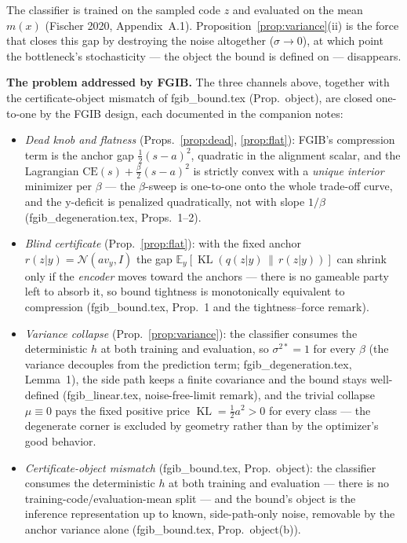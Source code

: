 \begin{remark}\label{rem:mismatch}
The classifier is trained on the sampled code $z$ and evaluated on the mean $m(x)$
(Fischer 2020, Appendix~A.1). Proposition~\ref{prop:variance}(ii) is the force that
closes this gap by destroying the noise altogether ($\sigma \to 0$), at which point the
bottleneck's stochasticity --- the object the bound is defined on --- disappears.
\end{remark}

\textbf{The problem addressed by FGIB.}
The three channels above, together with the certificate-object mismatch of
fgib\_bound.tex (Prop.~object), are closed one-to-one by the FGIB design, each documented
in the companion notes:
\begin{itemize}
\item \emph{Dead knob and flatness} (Props.~\ref{prop:dead}, \ref{prop:flat}): FGIB's
compression term is the anchor gap $\tfrac12(s-a)^2$, quadratic in the alignment scalar,
and the Lagrangian $\mathrm{CE}(s) + \tfrac{\beta}{2}(s-a)^2$ is strictly convex with a
\emph{unique interior} minimizer per $\beta$ --- the $\beta$-sweep is one-to-one onto the
whole trade-off curve, and the y-deficit is penalized quadratically, not with slope
$1/\beta$ (fgib\_degeneration.tex, Props.~1--2).
\item \emph{Blind certificate} (Prop.~\ref{prop:flat}): with the fixed anchor
$r(z|y) = \mathcal{N}(a v_y, I)$ the gap
$\mathbb{E}_y[\operatorname{KL}(q(z|y)\,\|\,r(z|y))]$ can shrink only if the
\emph{encoder} moves toward the anchors --- there is no gameable party left to absorb it,
so bound tightness is monotonically equivalent to compression (fgib\_bound.tex, Prop.~1
and the tightness--force remark).
\item \emph{Variance collapse} (Prop.~\ref{prop:variance}): the classifier consumes the
deterministic $h$ at both training and evaluation, so $\sigma^{2*} = 1$ for every $\beta$
(the variance decouples from the prediction term; fgib\_degeneration.tex, Lemma~1), the
side path keeps a finite covariance and the bound stays well-defined
(fgib\_linear.tex, noise-free-limit remark), and the trivial collapse $\mu \equiv 0$ pays
the fixed positive price $\operatorname{KL} = \tfrac12 a^2 > 0$ for every class --- the
degenerate corner is excluded by geometry rather than by the optimizer's good behavior.
\item \emph{Certificate-object mismatch} (fgib\_bound.tex, Prop.~object): the classifier
consumes the deterministic $h$ at both training and evaluation --- there is no
training-code/evaluation-mean split --- and the bound's object is the inference
representation up to known, side-path-only noise, removable by the anchor variance alone
(fgib\_bound.tex, Prop.~object(b)).
\end{itemize}
